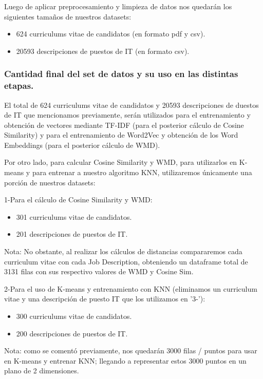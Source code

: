 \documentclass[12pt,a4paper]{article}
\begin{document}
\begin{sloppypar}
Luego de aplicar preprocesamiento y limpieza de datos nos quedarán los siguientes tamaños de nuestros datasets:
\begin{itemize}
\item 624 curriculums vitae de candidatos (en formato pdf y csv).
\item 20593 descripciones de puestos de IT (en formato csv).
\end{itemize}

\cleardoublepage

\subsubsection{Cantidad final del set de datos y su uso en las distintas etapas.}

El total de 624 curriculums vitae de candidatos y 20593 descripciones de duestos de IT que mencionamos previamente, serán utilizados para el entrenamiento y obtención de vectores mediante TF-IDF (para el posterior cálculo de Cosine Similarity) y para el entrenamiento de Word2Vec y obtención de los Word Embeddings (para el posterior cálculo de WMD).

Por otro lado, para calcular Cosine Similarity y WMD, para utilizarlos en K-means y para entrenar a nuestro algoritmo KNN, utilizaremos únicamente una porción de nuestros datasets:

1-Para el cálculo de Cosine Similarity y WMD:
\begin{itemize}
\item 301 curriculums vitae de candidatos.
\item 201 descripciones de puestos de IT.
\end{itemize}
Nota: No obstante, al realizar los cálculos de distancias compararemos cada curriculum vitae con cada Job Description, obteniendo un dataframe total de 3131 filas con sus respectivo valores de WMD y Cosine Sim.

2-Para el uso de K-means y entrenamiento con KNN (eliminamos un curriculum vitae y una descripción de puesto IT que los utilizamos en '3-'):
\begin{itemize}
\item 300 curriculums vitae de candidatos.
\item 200 descripciones de puestos de IT.
\end{itemize}        
Nota: como se comentó previamente, nos quedarán 3000 filas / puntos para usar en K-means y entrenar KNN; llegando a representar estos 3000 puntos en un plano de 2 dimensiones.


\end{sloppypar}
\end{document}
